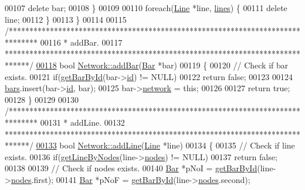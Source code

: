 \begin{DoxyCode}
00107     \textcolor{keyword}{delete} bar;
00108   \}
00109 
00110   \textcolor{keywordflow}{foreach}(\hyperlink{class_line}{Line} *line, \hyperlink{class_network_acda0fd42e712e460a08a0e96511ee7eb}{lines}) \{
00111     \textcolor{keyword}{delete} line;
00112   \}
00113 \}
00114 
00115 \textcolor{comment}{/*******************************************************************************}
00116 \textcolor{comment}{ * addBar.}
00117 \textcolor{comment}{ ******************************************************************************/}
\hypertarget{network_8cpp_source_l00118}{}\hyperlink{group___graphics_ga8c5dfef0216731246f7411e1a5fbee01}{00118} \textcolor{keywordtype}{bool} \hyperlink{group___graphics_ga8c5dfef0216731246f7411e1a5fbee01}{Network::addBar}(\hyperlink{class_bar}{Bar} *bar)
00119 \{
00120   \textcolor{comment}{// Check if bar exists.}
00121   \textcolor{keywordflow}{if}(\hyperlink{group___graphics_ga04d524ce0fa0dd0d06deda92b1597af0}{getBarById}(bar->\hyperlink{class_bar_a9dc5c6a6d44fe412ae34ef8a881b8dce}{id}) != NULL)
00122     \textcolor{keywordflow}{return} \textcolor{keyword}{false};
00123 
00124   \hyperlink{class_network_a7fe628f7de34a96235cbd3f2cee4aff2}{bars}.insert(bar->\hyperlink{class_bar_a9dc5c6a6d44fe412ae34ef8a881b8dce}{id}, bar);
00125   bar->\hyperlink{class_bar_a80025f13884750add58cc61b318357ff}{network} = \textcolor{keyword}{this};
00126 
00127   \textcolor{keywordflow}{return} \textcolor{keyword}{true};
00128 \}
00129 
00130 \textcolor{comment}{/*******************************************************************************}
00131 \textcolor{comment}{ * addLine.}
00132 \textcolor{comment}{ ******************************************************************************/}
\hypertarget{network_8cpp_source_l00133}{}\hyperlink{group___graphics_gae02945131494987b3ff9b59b627719b4}{00133} \textcolor{keywordtype}{bool} \hyperlink{group___graphics_gae02945131494987b3ff9b59b627719b4}{Network::addLine}(\hyperlink{class_line}{Line} *line)
00134 \{
00135   \textcolor{comment}{// Check if line exists.}
00136   \textcolor{keywordflow}{if}(\hyperlink{group___graphics_ga8f090b85a7779695cb9f05b6395b3044}{getLineByNodes}(line->\hyperlink{class_line_afd17c40d656e6a8d677cb22df5f0c70b}{nodes}) != NULL)
00137     \textcolor{keywordflow}{return} \textcolor{keyword}{false};
00138 
00139   \textcolor{comment}{// Check if nodes exists.}
00140   \hyperlink{class_bar}{Bar} *pNoI = \hyperlink{group___graphics_ga04d524ce0fa0dd0d06deda92b1597af0}{getBarById}(line->\hyperlink{class_line_afd17c40d656e6a8d677cb22df5f0c70b}{nodes}.first);
00141   \hyperlink{class_bar}{Bar} *pNoF = \hyperlink{group___graphics_ga04d524ce0fa0dd0d06deda92b1597af0}{getBarById}(line->\hyperlink{class_line_afd17c40d656e6a8d677cb22df5f0c70b}{nodes}.second);

\end{DoxyCode}
